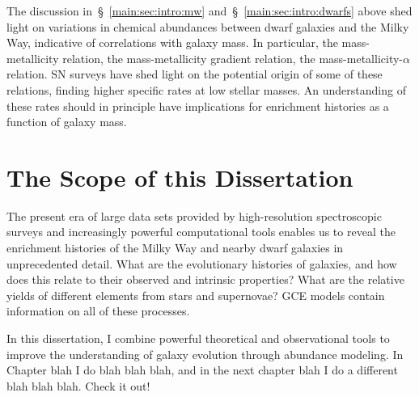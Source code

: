 \documentclass[main.tex]{subfiles}
\begin{document}
\begin{doublespace}
The discussion in~\S~\ref{main:sec:intro:mw} and~\S~\ref{main:sec:intro:dwarfs}
above shed light on variations in chemical abundances between dwarf galaxies
and the Milky Way, indicative of correlations with galaxy mass.
In particular, the mass-metallicity relation, the mass-metallicity gradient
relation, the mass-metallicity-$\alpha$ relation.
SN surveys have shed light on the potential origin of some of these relations,
finding higher specific rates at low stellar masses.
An understanding of these rates should in principle have implications for
enrichment histories as a function of galaxy mass.

\section{The Scope of this Dissertation}
\label{main:sec:intro:scope}

The present era of large data sets provided by high-resolution spectroscopic
surveys and increasingly powerful computational tools enables us to reveal the
enrichment histories of the Milky Way and nearby dwarf galaxies in
unprecedented detail.
What are the evolutionary histories of galaxies, and how does this relate to
their observed and intrinsic properties?
What are the relative yields of different elements from stars and supernovae?
GCE models contain information on all of these processes.
\par
In this dissertation, I combine powerful theoretical and observational tools
to improve the understanding of galaxy evolution through abundance modeling.
In Chapter blah I do blah blah blah, and in the next chapter blah I do a
different blah blah blah.
Check it out!

\end{doublespace}
\end{document}
